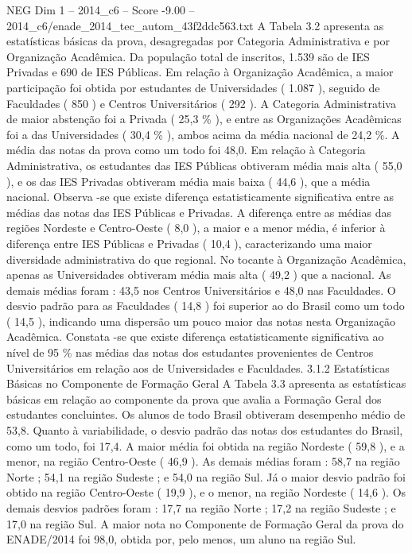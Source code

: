 \begin{textsample}{NEG Dim 1 – 2014\_c6 – Score -9.00 – 2014\_c6/enade\_2014\_tec\_autom\_43f2ddc563.txt}
A Tabela 3.2 apresenta as estatísticas básicas da prova, desagregadas por Categoria Administrativa e por Organização Acadêmica.
Da população total de inscritos, 1.539 são de IES Privadas e 690 de IES Públicas.
Em relação à Organização Acadêmica, a maior participação foi obtida por estudantes de Universidades ( 1.087 ), seguido de Faculdades ( 850 ) e Centros Universitários ( 292 ).
A Categoria Administrativa de maior abstenção foi a Privada ( 25,3 \% ), e entre as Organizações Acadêmicas foi a das Universidades ( 30,4 \% ), ambos acima da média nacional de 24,2 \%.
A média das notas da prova como um todo foi 48,0.
Em relação à Categoria Administrativa, os estudantes das IES Públicas obtiveram média mais alta ( 55,0 ), e os das IES Privadas obtiveram média mais baixa ( 44,6 ), que a média nacional.
Observa -se que existe diferença estatisticamente significativa entre as médias das notas das IES Públicas e Privadas.
A diferença entre as médias das regiões Nordeste e Centro-Oeste ( 8,0 ), a maior e a menor média, é inferior à diferença entre IES Públicas e Privadas ( 10,4 ), caracterizando uma maior diversidade administrativa do que regional.
No tocante à Organização Acadêmica, apenas as Universidades obtiveram média mais alta ( 49,2 ) que a nacional.
As demais médias foram : 43,5 nos Centros Universitários e 48,0 nas Faculdades.
O desvio padrão para as Faculdades ( 14,8 ) foi superior ao do Brasil como um todo ( 14,5 ), indicando uma dispersão um pouco maior das notas nesta Organização Acadêmica.
Constata -se que existe diferença estatisticamente significativa ao nível de 95 \% nas médias das notas dos estudantes provenientes de Centros Universitários em relação aos de Universidades e Faculdades. 3.1.2 Estatísticas Básicas no Componente de Formação Geral A Tabela 3.3 apresenta as estatísticas básicas em relação ao componente da prova que avalia a Formação Geral dos estudantes concluintes.
Os alunos de todo Brasil obtiveram desempenho médio de 53,8.
Quanto à variabilidade, o desvio padrão das notas dos estudantes do Brasil, como um todo, foi 17,4.
A maior média foi obtida na região Nordeste ( 59,8 ), e a menor, na região Centro-Oeste ( 46,9 ).
As demais médias foram : 58,7 na região Norte ; 54,1 na região Sudeste ; e 54,0 na região Sul.
Já o maior desvio padrão foi obtido na região Centro-Oeste ( 19,9 ), e o menor, na região Nordeste ( 14,6 ).
Os demais desvios padrões foram : 17,7 na região Norte ; 17,2 na região Sudeste ; e 17,0 na região Sul.
A maior nota no Componente de Formação Geral da prova do ENADE/2014 foi 98,0, obtida por, pelo menos, um aluno na região Sul.

\end{textsample}
